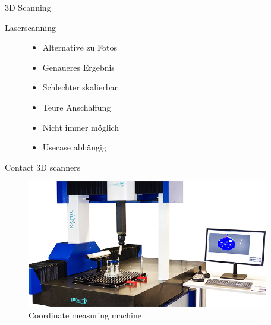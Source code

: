 \begin{frame}{3D Scanning}
\begin{block}{Laserscanning}
\begin{figure}[t]
\begin{minipage}[m]{0.3\textwidth}
\begin{figure}[b]
            \label{fig:my_label}
        \end{figure}
        \end{minipage}
        \hfill
        \begin{minipage}[m]{0.3\textwidth}
            \begin{itemize}
                \item Alternative zu Fotos
                \item Genaueres Ergebnis
                \item Schlechter skalierbar
                \item Teure Anschaffung
                \item Nicht immer möglich
                \item Usecase abhängig
            \end{itemize}
        \end{minipage}
    \end{figure}
    \end{block}
\end{frame}

\begin{frame}{Contact 3D scanners}
\begin{figure}
    \centering
    \includegraphics[width=300pt]{img_niklas/CMM.png}
    \caption*{Coordinate measuring machine}
    \label{fig:my_label}
\end{figure}
    
\end{frame}

